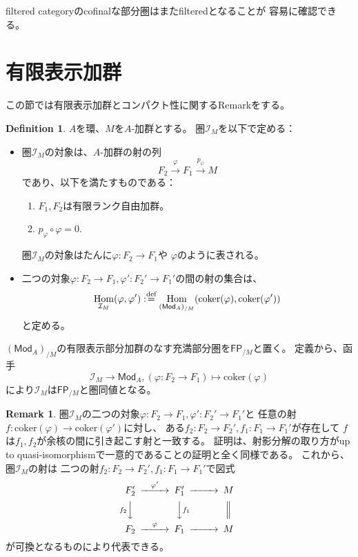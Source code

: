\documentclass[uplatex]{jsarticle}
\theoremstyle{definition}
\newtheorem{defi}[defi]{Definition}
\newtheorem{rem}[rem]{Remark}
\theoremstyle{plain}
\DeclareMathOperator{\Hom}{\mathrm{Hom}}
\newcommand{\coker}{\mathrm{coker}}
\newcommand{\FP}[1]{\mathsf{FP}_{/#1}}
\newcommand{\dfn}{:\overset{\mbox{{\scriptsize def}}}{=}}
\newcommand{\Mod}{\mathsf{Mod}}
\newcommand{\mcI}{\mathcal{I}}
\begin{document}
filtered categoryのcofinalな部分圏はまたfilteredとなることが
容易に確認できる。





\section{有限表示加群}
\label{fp-modules section}

この節では有限表示加群とコンパクト性に関するRemarkをする。

\begin{defi}
  \(A\)を環、\(M\)を\(A\)-加群とする。
  圏\(\mcI_M\)を以下で定める：
  \begin{itemize}
    \item
    圏\(\mcI_M\)の対象は、\(A\)-加群の射の列
    \[
    F_2\xrightarrow{\varphi} F_1\xrightarrow{p_{\varphi}} M
    \]
    であり、以下を満たすものである：
    \begin{enumerate}
      \item
      \(F_1,F_2\)は有限ランク自由加群。
      \item
      \(p_{\varphi}\circ \varphi = 0\).
    \end{enumerate}
    圏\(\mathcal{I}_M\)の対象はたんに\(\varphi:F_2\to F_1\)や
    \(\varphi\)のように表される。
    \item
    二つの対象\(\varphi:F_2\to F_1, \varphi':F_2'\to F_1'\)の間の射の集合は、
    \[
    \Hom_{\mcI_M}(\varphi,\varphi') \dfn
    \Hom_{(\Mod_A)_{/M}}(\coker(\varphi),\coker(\varphi'))
    \]
    と定める。
  \end{itemize}
  \((\Mod_A)_{/M}\)の有限表示部分加群のなす充満部分圏を\(\FP{M}\)と置く。
  定義から、函手
  \[
  \mcI_M \to \Mod_A , (\varphi:F_2\to F_1) \mapsto \coker(\varphi)
  \]
  により\(\mcI_M\)は\(\FP{M}\)と圏同値となる。
\end{defi}




\begin{rem}\label{rem: I_M rem}
  圏\(\mcI_M\)の二つの対象\(\varphi:F_2\to F_1,\varphi':F_2'\to F_1'\)と
  任意の射\(f:\coker(\varphi)\to \coker(\varphi')\)に対し、
  ある\(f_2:F_2\to F_2', f_1:F_1\to F_1'\)が存在して
  \(f\)は\(f_1,f_2\)が余核の間に引き起こす射と一致する。
  証明は、射影分解の取り方がup to quasi-isomorphismで一意的であることの証明と全く同様である。
  これから、圏\(\mcI_M\)の射は
  二つの射\(f_2:F_2\to F_2', f_1:F_1\to F_1'\)で図式
  \[
  \begin{CD}
    F_2' @>\varphi'>> F_1' @>>> M \\
    @Vf_2VV @VVf_1V @| \\
    F_2 @>\varphi>> F_1 @>>> M
  \end{CD}
  \]
  が可換となるものにより代表できる。
\end{rem}
\end{document}
